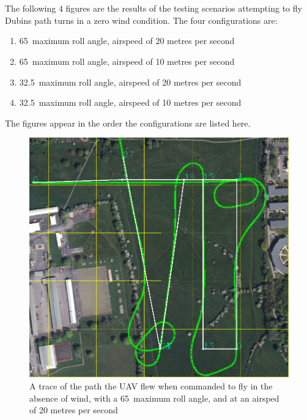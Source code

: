 \chapter{} 
\label{app:NoWindMaps}

\graphicspath{{Appendix5/Figs/}}

\renewcommand{\thefigure}{E\arabic{figure}}

\setcounter{figure}{0}

The following 4 figures are the results of the testing scenarios attempting to fly Dubins path turns in a zero wind condition. The four configurations are:

\begin{enumerate}
	\item 65\degree\  maximum roll angle, airspeed of 20 metres per second
	\item 65\degree\  maximum roll angle, airspeed of 10 metres per second
	\item 32.5\degree\  maximum roll angle, airspeed of 20 metres per second
	\item 32.5\degree\  maximum roll angle, airspeed of 10 metres per second
\end{enumerate}

The figures appear in the order the configurations are listed here.


\begin{figure}[htbp!] 
\centering    
\includegraphics[width=\textwidth]{65_20_NoWind}
\caption{A trace of the path the UAV flew when commanded to fly in the absence of wind, with a 65\degree\  maximum roll angle, and at an airsped of 20 metres per second}
\end{figure}

